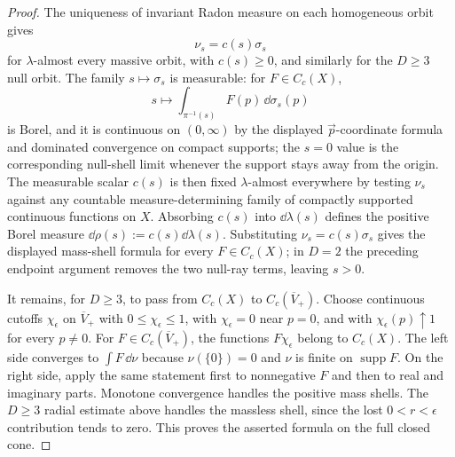 \begin{proof}
The uniqueness of invariant Radon measure on each homogeneous orbit gives
\[
  \nu_s=c(s)\sigma_s
\]
for \(\lambda\)-almost every massive orbit, with \(c(s)\ge0\), and similarly
for the \(D\ge3\) null orbit.  The family \(s\mapsto\sigma_s\) is measurable:
for \(F\in C_c(X)\),
\[
  s\longmapsto \int_{\pi^{-1}(s)}F(p)\,\dd\sigma_s(p)
\]
is Borel, and it is continuous on \((0,\infty)\) by the displayed
\(\vec p\)-coordinate formula and dominated convergence on compact supports;
the \(s=0\) value is the corresponding null-shell limit whenever the support
stays away from the origin.  The measurable scalar \(c(s)\) is then fixed
\(\lambda\)-almost everywhere by testing \(\nu_s\) against any countable
measure-determining family of compactly supported continuous functions on
\(X\).  Absorbing \(c(s)\) into \(\dd\lambda(s)\) defines the positive Borel
measure \(\dd\rho(s):=c(s)\dd\lambda(s)\).  Substituting
\(\nu_s=c(s)\sigma_s\) gives the displayed mass-shell formula for every
\(F\in C_c(X)\); in \(D=2\) the preceding endpoint argument removes the two
null-ray terms, leaving \(s>0\).

It remains, for \(D\ge3\), to pass from \(C_c(X)\) to
\(C_c(\overline V_+)\).  Choose continuous cutoffs \(\chi_\epsilon\) on
\(\overline V_+\) with \(0\le\chi_\epsilon\le1\), with \(\chi_\epsilon=0\) near
\(p=0\), and with \(\chi_\epsilon(p)\uparrow1\) for every \(p\ne0\).  For
\(F\in C_c(\overline V_+)\), the functions \(F\chi_\epsilon\) belong to
\(C_c(X)\).  The left side converges to \(\int F\,\dd\nu\) because
\(\nu(\{0\})=0\) and \(\nu\) is finite on \(\operatorname{supp}F\).  On the
right side, apply the same statement first to nonnegative \(F\) and then to
real and imaginary parts.  Monotone convergence handles the positive mass
shells.  The \(D\ge3\) radial estimate above handles the massless shell, since
the lost \(0<r<\epsilon\) contribution tends to zero.  This proves the asserted
formula on the full closed cone.
\end{proof}

